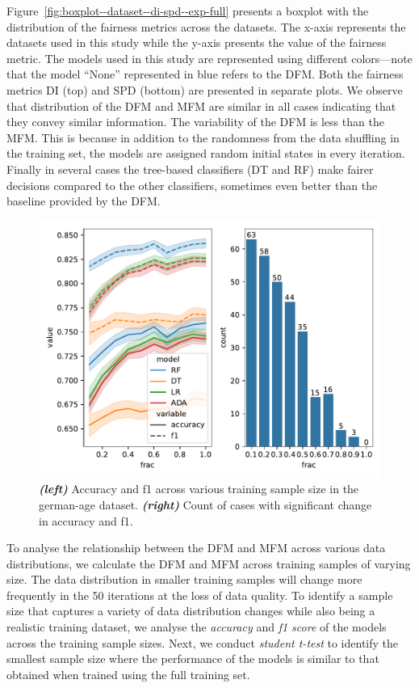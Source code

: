 \documentclass[sigconf,review,anonymous]{acmart}
\begin{document}
Figure \ref{fig:boxplot--dataset--di-spd--exp-full} presents a boxplot
with the distribution of the fairness metrics across the datasets. The
x-axis represents the datasets used in this study while the y-axis
presents the value of the fairness metric. The models used in this
study are represented using different colors---note that the model
``None'' represented in blue refers to the DFM. Both the fairness
metrics DI (top) and SPD (bottom) are presented in separate plots. We
observe that distribution of the DFM and MFM are similar in all cases
indicating that they convey similar information. The variability of
the DFM is less than the MFM. This is because in addition to the
randomness from the data shuffling in the training set, the models are
assigned random initial states in every iteration. Finally in several
cases the tree-based classifiers (DT and RF) make fairer decisions
compared to the other classifiers, sometimes even better than the
baseline provided by the DFM.

\begin{figure}
  \centering
  \includegraphics[width=0.95\linewidth]{training-set-frac-threshold.pdf}
  \caption{\emph{\textbf{(left)}} Accuracy and f1 across various
  training sample size in the german-age
  dataset. \emph{\textbf{(right)}} Count of cases with significant
  change in accuracy and f1.}
  \label{fig:training-set-frac-threshold}
\end{figure}

To analyse the relationship between the DFM and MFM across various
data distributions, we calculate the DFM and MFM across training
samples of varying size. The data distribution in smaller training
samples will change more frequently in the 50 iterations at the loss
of data quality. To identify a sample size that captures a variety of
data distribution changes while also being a realistic training
dataset, we analyse the \emph{accuracy} and \emph{f1 score} of the
models across the training sample sizes. Next, we conduct
\emph{student t-test} to identify the smallest sample size where the
performance of the models is similar to that obtained when trained
using the full training set.
\end{document}

